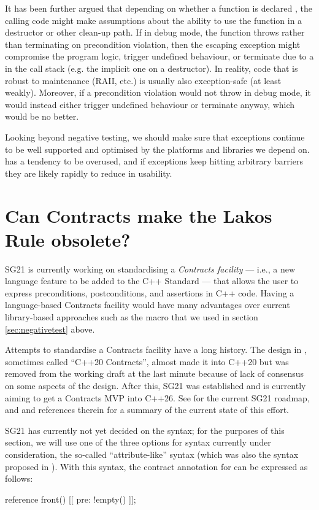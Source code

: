 It has been further argued that depending on whether a function is declared , the calling code might make assumptions about the ability to use the function in a destructor or other clean-up path. If in debug mode, the function throws rather than terminating on precondition violation, then the escaping exception might compromise the program logic, trigger undefined behaviour, or terminate due to a  in the call 
stack (e.g. the implicit one on a destructor). In reality, code that is robust to maintenance (RAII, etc.) is usually also exception-safe (at least weakly). Moreover, if a precondition violation would not throw in debug mode, it would instead either trigger undefined behaviour or terminate anyway, which would be no better.

Looking beyond negative testing, we should make sure that exceptions continue to be well supported and optimised by the platforms and libraries we depend on.  has a tendency to be overused, and if exceptions keep hitting arbitrary  barriers they are likely rapidly to reduce in usability. 

\section{Can Contracts make the Lakos Rule obsolete?}
\label{sec:contracts}

SG21 is currently working on standardising a \emph{Contracts facility} --- i.e., a new language feature to be added to the C++ Standard --- that allows the user to express preconditions, postconditions, and assertions in C++ code. Having a language-based Contracts facility would have many advantages over current library-based approaches such as the  macro that we used in section \ref{sec:negativetest} above.

Attempts to standardise a Contracts facility have a long history. The design in \cite{P0542R5}, sometimes called ``C++20 Contracts'', almost made it into C++20 but was removed from the working draft at the last minute because of lack of consensus on some aspects of the design. After this, SG21 was established and is currently aiming to get a Contracts MVP into C++26. See \cite{P2695R1} for the current SG21 roadmap, and \cite{P2521R3} and references therein for a summary of the current state of this effort.

SG21 has currently not yet decided on the syntax; for the purposes of this section, we will use one of the three options for syntax currently under consideration, the so-called ``attribute-like'' syntax (which was also the syntax proposed in \cite{P0542R5}). With this syntax, the contract annotation for  can be expressed as follows:
\begin{codeblock}
reference front() [[ pre: !empty() ]];
\end{codeblock}

